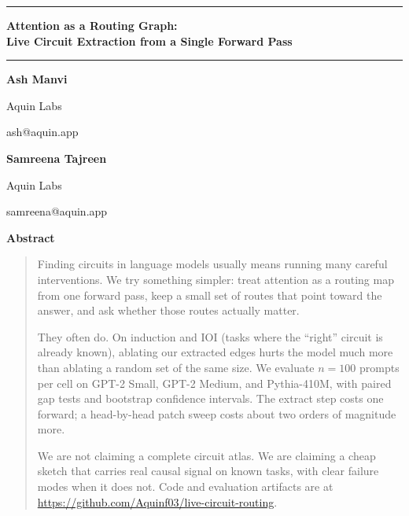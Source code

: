 \documentclass[11pt]{article}
\begin{document}
\thispagestyle{empty}
\vspace*{0.5cm}

\noindent\rule{\textwidth}{2pt}

\vspace{0.45cm}
\begin{center}
  {\LARGE\bfseries Attention as a Routing Graph:\\[0.15em]
  Live Circuit Extraction from a Single Forward Pass}
\end{center}
\vspace{0.35cm}

\noindent\rule{\textwidth}{0.8pt}

\vspace{0.6cm}

\begin{center}
\begin{minipage}[t]{0.3\textwidth}
\centering
{\bfseries Ash Manvi}\par
Aquin Labs\par
{\ttfamily ash@aquin.app}
\end{minipage}
\hfill
\begin{minipage}[t]{0.3\textwidth}
\centering
{\bfseries Samreena Tajreen}\par
Aquin Labs\par
{\ttfamily samreena@aquin.app}
\end{minipage}
\end{center}

\vspace{0.55cm}

\begin{center}
  {\Large\bfseries Abstract}
\end{center}

\begin{quote}
Finding circuits in language models usually means running many careful
interventions. We try something simpler: treat attention as a routing map from
one forward pass, keep a small set of routes that point toward the answer, and
ask whether those routes actually matter.

They often do. On induction and IOI (tasks where the ``right'' circuit is
already known), ablating our extracted edges hurts the model much more than
ablating a random set of the same size. We evaluate \(n{=}100\) prompts per
cell on GPT-2 Small, GPT-2 Medium, and Pythia-410M, with paired gap tests and
bootstrap confidence intervals. The extract step costs one forward; a
head-by-head patch sweep costs about two orders of magnitude more.

We are not claiming a complete circuit atlas. We are claiming a cheap sketch
that carries real causal signal on known tasks, with clear failure modes when
it does not. Code and evaluation artifacts are at
\url{https://github.com/Aquinf03/live-circuit-routing}.
\end{quote}
\end{document}

